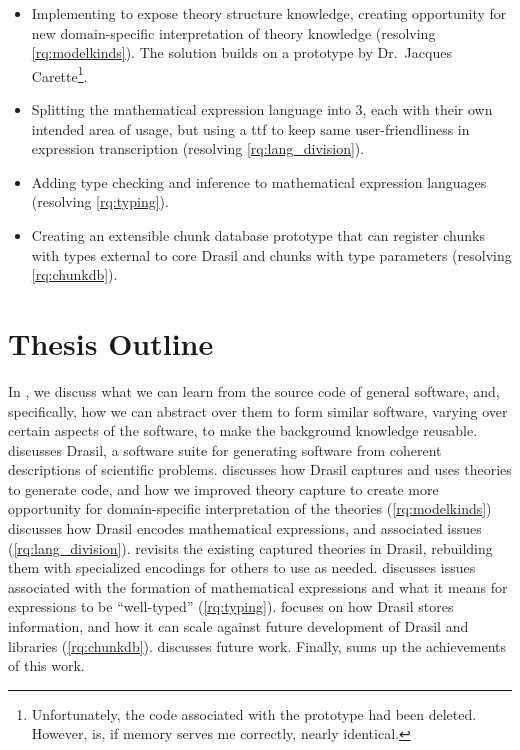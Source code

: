 \begin{itemize}

      \item Implementing \ModelKinds{} to expose theory structure knowledge,
            creating opportunity for new domain-specific interpretation of
            theory knowledge (resolving \ref{rq:modelkinds}). The solution
            builds on a prototype by Dr.\ Jacques Carette\footnote{Unfortunately,
                  the code associated with the prototype had been deleted. However,
                   is, if memory serves me
                  correctly, nearly identical.}.

      \item Splitting the mathematical expression language into 3, each with
            their own intended area of usage, but using a \acs{ttf}
            \cite{Carette2009} to keep same user-friendliness in expression
            transcription (resolving \ref{rq:lang_division}).

      \item Adding type checking and inference to mathematical expression
            languages (resolving \ref{rq:typing}).

      \item Creating an extensible chunk database prototype that can register
            chunks with types external to core Drasil and chunks with type
            parameters (resolving \ref{rq:chunkdb}).

\end{itemize}

\section{Thesis Outline}
\label{chap:intro:sec:thesis-outline}

In , we discuss what we can learn from the source code of
general software, and, specifically, how we can abstract over them to form
similar software, varying over certain aspects of the software, to make the
background knowledge reusable.  discusses Drasil, a software
suite for generating software from coherent descriptions of scientific problems.
 discusses how Drasil captures and uses theories to
generate code, and how we improved theory capture to create more opportunity for
domain-specific interpretation of the theories (\ref{rq:modelkinds})
 discusses how Drasil encodes mathematical expressions,
and associated issues (\ref{rq:lang_division}). 
revisits the existing captured theories in Drasil, rebuilding them with
specialized encodings for others to use as needed. 
discusses issues associated with the formation of mathematical expressions and
what it means for expressions to be ``well-typed'' (\ref{rq:typing}).
 focuses on how Drasil stores information, and how it
can scale against future development of Drasil and libraries (\ref{rq:chunkdb}).
 discusses future work. Finally, 
sums up the achievements of this work.
